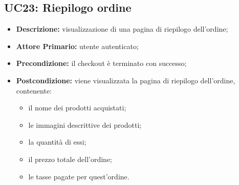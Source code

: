 \subsection{UC23: Riepilogo ordine}
\label{sec:UC23}
\begin{itemize}
    \item \textbf{Descrizione:} visualizzazione di una pagina di riepilogo dell'ordine;
    \item \textbf{Attore Primario:} utente autenticato;
    \item \textbf{Precondizione:} il checkout è terminato con successo;
    \item \textbf{Postcondizione:} viene visualizzata la pagina di riepilogo dell'ordine, contenente:
          \begin{itemize}
              \item il nome dei prodotti acquistati;
              \item le immagini descrittive dei prodotti;
              \item la quantità di essi;
              \item il prezzo totale dell'ordine;
              \item le tasse pagate per quest'ordine.
          \end{itemize}
\end{itemize}
